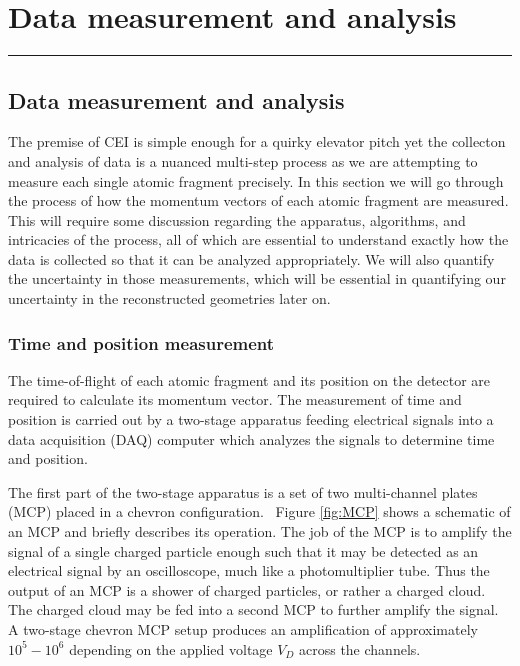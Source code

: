 \chapter{Data measurement and analysis} \label{ch:data}

\vspace{-1.5 em}
\begin{addmargin}[-0.5cm]{0cm}
  \minitoc
\end{addmargin}
\hrule
\vspace{1.5 em}

\section{Data measurement and analysis}
The premise of CEI is simple enough for a quirky elevator pitch yet the collecton and analysis of data is a nuanced multi-step process as we are attempting to measure each single atomic fragment precisely. In this section we will go through the process of how the momentum vectors of each atomic fragment are measured. This will require some discussion regarding the apparatus, algorithms, and intricacies of the process, all of which are essential to understand exactly how the data is collected so that it can be analyzed appropriately. We will also quantify the uncertainty in those measurements, which will be essential in quantifying our uncertainty in the reconstructed geometries later on.

\subsection{Time and position measurement}
The time-of-flight of each atomic fragment and its position on the detector are required to calculate its momentum vector. The measurement of time and position is carried out by a two-stage apparatus feeding electrical signals into a data acquisition (DAQ) computer which analyzes the signals to determine time and position.

The first part of the two-stage apparatus is a set of two multi-channel plates (MCP) placed in a chevron configuration.\footnotemark~ Figure \ref{fig:MCP} shows a schematic of an MCP and briefly describes its operation. The job of the MCP is to amplify the signal of a single charged particle enough such that it may be detected as an electrical signal by an oscilloscope, much like a photomultiplier tube. Thus the output of an MCP is a shower of charged particles, or rather a charged cloud. The charged cloud may be fed into a second MCP to further amplify the signal. A two-stage chevron MCP setup produces an amplification of approximately $10^5-10^6$ depending on the applied voltage $V_D$ across the channels.

